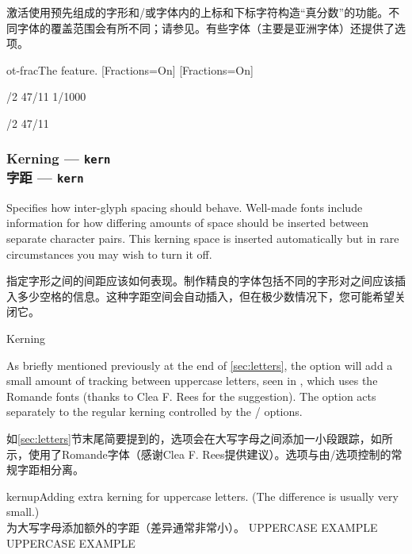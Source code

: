 \documentclass[a4paper]{l3doc}
\begin{document}
激活使用预先组成的字形和/或字体内的上标和下标字符构造“真分数”的功能。不同字体的覆盖范围会有所不同；请参见。有些字体（主要是亚洲字体）还提供了选项。

\begin{Lexample}{ot-frac}{The  feature.}
\setsansfont{Lato}[Fractions=On]
\setmonofont{IBM Plex Mono}[Fractions=On]

/2 47/11 1/1000 \par
{}/2 47/11
\end{Lexample}



\subsubsection{Kerning --- \texttt{kern}\\字距 --- \texttt{kern}}
\label{sec:kerning}

Specifies how inter-glyph spacing should behave.
Well-made fonts include information for how differing
amounts of space should be inserted between separate character pairs.
This kerning space is inserted automatically but in rare
circumstances you may wish to turn it off.

指定字形之间的间距应该如何表现。制作精良的字体包括不同的字形对之间应该插入多少空格的信息。这种字距空间会自动插入，但在极少数情况下，您可能希望关闭它。

\begin{features}{Kerning}
\end{features}

As briefly mentioned previously at the end of \vref{sec:letters},
the  option will add a small amount of tracking between
uppercase letters, seen in , which uses the Romande
fonts
(thanks to Clea F. Rees for the suggestion).
The  option acts separately to the regular kerning
controlled by the / options.

如\ref{sec:letters}节末尾简要提到的，选项会在大写字母之间添加一小段跟踪，如所示，使用了Romande字体（感谢Clea F. Rees提供建议）。选项与由/选项控制的常规字距相分离。

\begin{Xexample}[firstline=2]{kernup}{Adding extra kerning for uppercase letters. (The difference is usually very small.)\\为大写字母添加额外的字距（差异通常非常小）。}
  \large
   UPPERCASE EXAMPLE \\
   UPPERCASE EXAMPLE
\end{Xexample}
\end{document}
